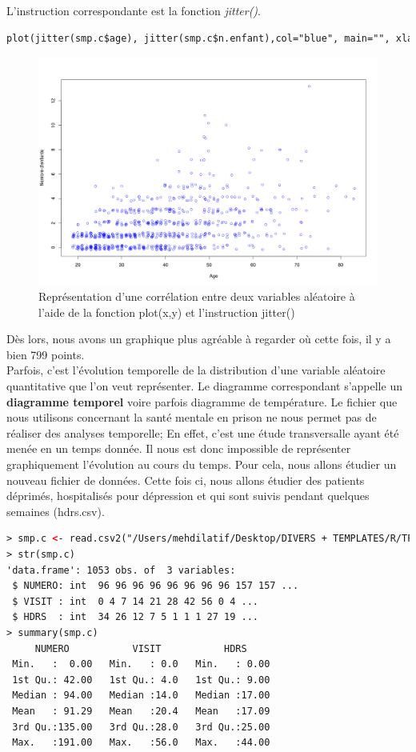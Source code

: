L'instruction correspondante est la fonction \textit{jitter()}.
\begin{lstlisting}[language=html]
plot(jitter(smp.c$age), jitter(smp.c$n.enfant),col="blue", main="", xlab = "Age", ylab="Nombre d'enfants")
\end{lstlisting}
\begin{figure}[H]\begin{center}\includegraphics[scale=0.3]{ilu/tp7.png}\caption{Représentation d'une corrélation entre deux variables aléatoire à l'aide de la fonction plot(x,y) et l'instruction jitter()}\end{center}\end{figure}
Dès lors, nous avons un graphique plus agréable à regarder où cette fois, il y a bien 799 points.\newline
\\
Parfois, c'est l'évolution temporelle de la distribution d'une variable aléatoire quantitative que l'on veut représenter. Le diagramme correspondant s'appelle un \textbf{diagramme temporel} voire parfois diagramme de température. Le fichier que nous utilisons concernant la santé mentale en prison ne nous permet pas de réaliser des analyses temporelle; En effet, c'est une étude transversalle ayant été menée en un temps donnée. Il nous est donc impossible de représenter graphiquement l'évolution au cours du temps. \newline
Pour cela, nous allons étudier un nouveau fichier de données. Cette fois ci, nous allons étudier des patients déprimés, hospitalisés pour dépression et qui sont suivis pendant quelques semaines (hdrs.csv).\newline
\\
\begin{lstlisting}[language=html]
> smp.c <- read.csv2("/Users/mehdilatif/Desktop/DIVERS + TEMPLATES/R/TP/outils_hdrs.csv")
> str(smp.c)
'data.frame': 1053 obs. of  3 variables:
 $ NUMERO: int  96 96 96 96 96 96 96 96 157 157 ...
 $ VISIT : int  0 4 7 14 21 28 42 56 0 4 ...
 $ HDRS  : int  34 26 12 7 5 1 1 1 27 19 ...
> summary(smp.c)
     NUMERO           VISIT           HDRS      
 Min.   :  0.00   Min.   : 0.0   Min.   : 0.00  
 1st Qu.: 42.00   1st Qu.: 4.0   1st Qu.: 9.00  
 Median : 94.00   Median :14.0   Median :17.00  
 Mean   : 91.29   Mean   :20.4   Mean   :17.09  
 3rd Qu.:135.00   3rd Qu.:28.0   3rd Qu.:25.00  
 Max.   :191.00   Max.   :56.0   Max.   :44.00  
\end{lstlisting}
